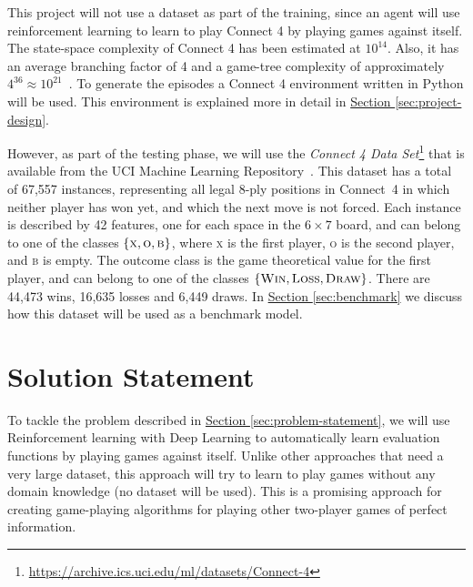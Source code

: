 \documentclass{article}
\begin{document}
This project will not use a dataset as part of the training, since an agent will use reinforcement
learning to learn to play Connect 4 by playing games against itself. The state-space complexity of
Connect 4 has been estimated at $10^{14}$. Also, it has an average branching factor of 4 and a
game-tree complexity of approximately $4^{36} \approx 10^{21}$~\citep{Allis1994PhD}. To generate the
episodes a Connect 4 environment written in Python will be used.  This environment is explained more
in detail in \hyperref[sec:project-design]{Section \ref*{sec:project-design}}.

However, as part of the testing phase, we will use the \emph{Connect 4 Data
Set}\footnote{\url{https://archive.ics.uci.edu/ml/datasets/Connect-4}} that is available from the
UCI Machine Learning Repository~\citep{Hettich1998UCI}. This dataset has a total of 67,557
instances, representing all legal 8-ply positions in \mbox{Connect 4} in which neither player has
won yet, and which the next move is not forced. Each instance is described by 42 features, one for
each space in the $6 \times 7$ board, and can belong to one of the classes $\{\textsc{x},
\textsc{o}, \textsc{b}\}$, where \textsc{x} is the first player, \textsc{o} is the second player,
and \textsc{b} is empty. The outcome class is the game theoretical value for the first player, and
can belong to one of the classes $\{\textsc{Win}, \textsc{Loss}, \textsc{Draw}\}$. There are 44,473
wins, 16,635 losses and 6,449 draws. In \hyperref[sec:benchmark]{Section \ref*{sec:benchmark}} we
discuss how this dataset will be used as a benchmark model.

\section{Solution Statement}

To tackle the problem described in \hyperref[sec:problem-statement]{Section
\ref*{sec:problem-statement}}, we will use Reinforcement learning with Deep Learning to
automatically learn evaluation functions by playing games against itself. Unlike other approaches
that need a very large dataset, this approach will try to learn to play games without any domain
knowledge (no dataset will be used). This is a promising approach for creating game-playing
algorithms for playing other two-player games of perfect information.
\end{document}
